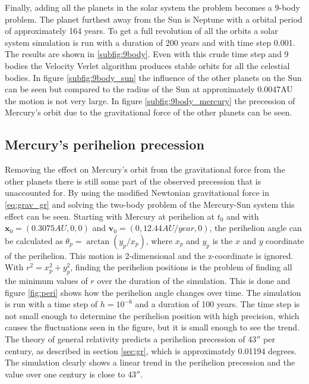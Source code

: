 \documentclass{article}
\begin{document}
Finally, adding all the planets in the solar system the problem becomes a 9-body problem. The planet furthest away from the Sun is Neptune with a orbital period of approximately 164 years. To get a full revolution of all the orbits a solar system simulation is run with a duration of 200 years and with time step 0.001. The results are shown in \ref{subfig:9body}. Even with this crude time step and 9 bodies the Velocity Verlet algorithm produces stable orbits for all the celestial bodies. In figure \ref{subfig:9body_sun} the influence of the other planets on the Sun can be seen but compared to the radius of the Sun at approximately 0.0047AU the motion is not very large. In figure \ref{subfig:9body_mercury} the precession of Mercury's orbit due to the gravitational force of the other planets can be seen.

\FloatBarrier
\subsection{Mercury's perihelion precession}

Removing the effect on Mercury's orbit from the gravitational force from the other planets there is still some part of the observed precession that is unaccounted for. By using the modified Newtonian gravitational force in \ref{eq:grav_gr} and solving the two-body problem of the Mercury-Sun system this effect can be seen. Starting with Mercury at perihelion at $t_0$ and with $\bm{x}_0=(0.3075AU, 0, 0)$ and $\bm{v}_0=(0, 12.44AU/year, 0)$, the perihelion angle can be calculated as $\theta_p = \arctan{(y_p/x_p)}$, where $x_p$ and $y_p$ is the $x$ and $y$ coordinate of the perihelion. This motion is 2-dimensional and the z-coordinate is ignored. With $r^2 = x_p^2 + y_p^2$, finding the perihelion positions is the problem of finding all the minimum values of $r$ over the duration of the simulation. This is done and figure \ref{fig:peri} shows how the perihelion angle changes over time. The simulation is run with a time step of $h=10^{-6}$ and a duration of 100 years. The time step is not small enough to determine the perihelion position with high precision, which causes the fluctuations seen in the figure, but it is small enough to see the trend. The theory of general relativity predicts a perihelion precession of 43$''$ per century, as described in section \ref{sec:gr}, which is approximately 0.01194 degrees. The simulation clearly shows a linear trend in the perihelion precession and the value over one century is close to 43$''$. 
\end{document}
